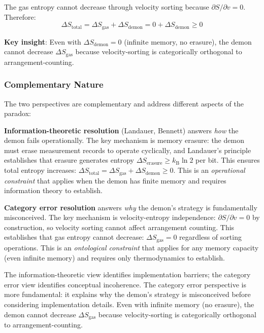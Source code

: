 \documentclass[10pt,twocolumn,letterpaper]{article}
\theoremstyle{definition}
\theoremstyle{remark}
\newcommand{\kb}{k_\text{B}}
\begin{document}
The gas entropy cannot decrease through velocity sorting because $\partial S/\partial v = 0$. Therefore:
\begin{equation}
\Delta S_{\text{total}} = \Delta S_{\text{gas}} + \Delta S_{\text{demon}} = 0 + \Delta S_{\text{demon}} \geq 0
\label{eq:category_total}
\end{equation}

\textbf{Key insight}: Even with $\Delta S_{\text{demon}} = 0$ (infinite memory, no erasure), the demon cannot decrease $\Delta S_{\text{gas}}$ because velocity-sorting is categorically orthogonal to arrangement-counting.

\subsubsection{Complementary Nature}

The two perspectives are complementary and address different aspects of the paradox:

\textbf{Information-theoretic resolution} (Landauer, Bennett) answers \textit{how} the demon fails operationally. The key mechanism is memory erasure: the demon must erase measurement records to operate cyclically, and Landauer's principle establishes that erasure generates entropy $\Delta S_{\text{erasure}} \geq \kb \ln 2$ per bit. This ensures total entropy increases: $\Delta S_{\text{total}} = \Delta S_{\text{gas}} + \Delta S_{\text{demon}} \geq 0$. This is an \textit{operational constraint} that applies when the demon has finite memory and requires information theory to establish.

\textbf{Category error resolution} answers \textit{why} the demon's strategy is fundamentally misconceived. The key mechanism is velocity-entropy independence: $\partial S/\partial v = 0$ by construction, so velocity sorting cannot affect arrangement counting. This establishes that gas entropy cannot decrease: $\Delta S_{\text{gas}} = 0$ regardless of sorting operations. This is an \textit{ontological constraint} that applies for any memory capacity (even infinite memory) and requires only thermodynamics to establish.

The information-theoretic view identifies implementation barriers; the category error view identifies conceptual incoherence. The category error perspective is more fundamental: it explains why the demon's strategy is misconceived before considering implementation details. Even with infinite memory (no erasure), the demon cannot decrease $\Delta S_{\text{gas}}$ because velocity-sorting is categorically orthogonal to arrangement-counting.
\end{document}
